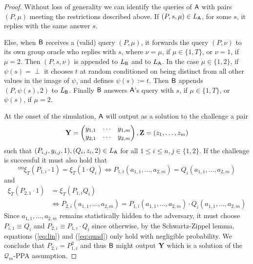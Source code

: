 \begin{proof}
Without loss of generality we can identify the queries of $\mathsf{A}$ with 
pairs $(P,\mu)$ meeting the restrictions described above. If $(P,s,\mu)\in L_{\mathsf{A}}$, for some $s$, it replies with the same answer $s$.

Else, when $\mathsf{B}$ receives a (valid) query $(P,\mu)$, it forwards the query $(P,\nu)$ to its own group oracle who replies with $s$, where $\nu=\mu$, if $\mu\in\{1,T\}$, or $\nu=1$, if $\mu=2$. Then $(P,s,\nu)$ is appended to $L_{\mathsf{B}}$ and to $L_{\mathsf{A}}$. In the case $\mu\in\{1,2\}$, if $\psi(s)=\perp$ it chooses $t$ at random conditioned on being distinct from all other values in the image of $\psi$, and defines $\psi(s):=t$. 
Then $\mathsf{B}$ appends $(P,\psi(s),2)$ to $L_{\mathsf{B}}$. Finally $\mathsf{B}$ answers $\mathsf{A}$'s query with $s$, if $\mu\in\{1,T\}$,  or $\psi(s)$, if $\mu=2$. 


At the onset of the simulation, $\mathsf{A}$ will output as a solution to the challenge a pair
$$
\mathbf{{Y}}=\left(\begin{matrix}y_{1,1}&\cdots&y_{1,m}\\y_{2,1}&\cdots&y_{2,m}\end{matrix}\right),\mathbf{{Z}} = (z_1,\ldots,z_m)
$$
such that 
$(P_{i,j},y_{i,j},1),(Q_{i},z_i,2) \in L_{\mathsf{A}}$ for all $1\leq i\leq n,j\in\{1,2\}$. If the challenge is successful it must also hold that
\begin{equation}ºº
\xi_T(P_{1,i}\cdot 1)=\xi_T(1\cdot Q_i) \Longleftrightarrow P_{1,i}(a_{1,1},\ldots,a_{2,m})=Q_{i}(a_{1,1},\ldots,a_{2,m})
\label{eq:lin}
\end{equation}
and
\begin{align}
	\xi_T(P_{2,1}\cdot 1) &=\xi_T(P_{1,i}Q_i) \nonumber\\
	&\Longleftrightarrow P_{2,i}(a_{1,1},\ldots,a_{2,m})=P_{1,i}(a_{1,1},\ldots,a_{2,m})\cdot Q_{i}(a_{1,1},\ldots,a_{2,m})
	\label{eq:quad}
\end{align}
Since $a_{1,1},\ldots,a_{2,m}$ remains statistically hidden to the adversary, it must choose $P_{i,1}\equiv Q_i$ and $P_{2,i}\equiv P_{1,i}\cdot Q_i$ since otherwise, by the Schwartz-Zippel lemma, equations (\ref{eq:lin}) and (\ref{eq:quad}) only hold with negligible probability. We conclude that $P_{2,i}=P^2_{1,i}$ and thus $\mathsf{B}$ might output $\mathbf{{Y}}$ which is a solution of the $\mathcal{Q}_m$-PPA assumption.
\end{proof}


